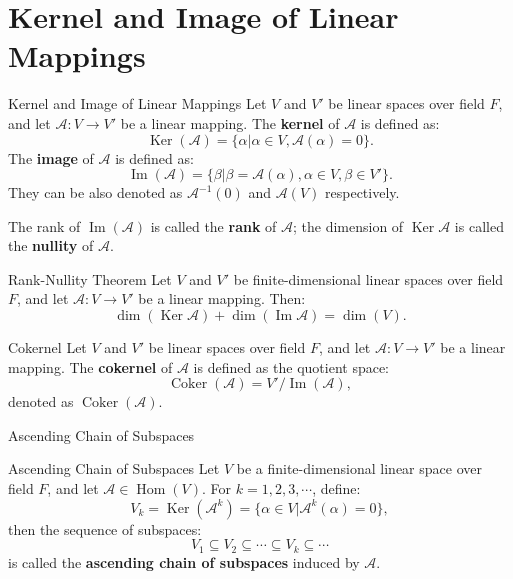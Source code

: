\documentclass[11pt]{../../TexTemplate/elegantbook} %
\begin{document}
\section{Kernel and Image of Linear Mappings}
\begin{definition}{Kernel and Image of Linear Mappings}
    Let \( V \) and \( V' \) be linear spaces over field \( F \), 
    and let \( \mathcal{A}: V \to V' \) be a linear mapping. 
    The \textbf{kernel} of \( \mathcal{A} \) is defined as:
    \[
    \operatorname{Ker}(\mathcal{A}) = \{ \alpha | \alpha \in V, \mathcal{A}(\alpha) = 0 \}.
    \]
    The \textbf{image} of \( \mathcal{A} \) is defined as:
    \[
    \operatorname{Im}(\mathcal{A}) = \{ \beta | \beta = \mathcal{A}(\alpha), 
    \alpha \in V, \beta \in V' \}.
    \]
    They can be also denoted as \( \mathcal{A}^{-1}(0) \) and \( \mathcal{A}(V) \) respectively.

    The rank of \( \operatorname{Im}(\mathcal{A}) \) is called the \textbf{rank} of \( \mathcal{A} \);
    the dimension of \( \operatorname{Ker}\mathcal{A} \) is called the \textbf{nullity} of \( \mathcal{A} \).
\end{definition}

\begin{property}
    
\end{property}


\begin{theorem}{Rank-Nullity Theorem}
    Let \( V \) and \( V' \) be finite-dimensional linear spaces over field \( F \), 
    and let \( \mathcal{A}: V \to V' \) be a linear mapping. Then:
    \[
    \dim(\operatorname{Ker}\mathcal{A}) + \dim(\operatorname{Im}\mathcal{A}) = \dim(V).
    \]
\end{theorem}


\begin{definition}{Cokernel}
    Let \( V \) and \( V' \) be linear spaces over field \( F \), 
    and let \( \mathcal{A}: V \to V' \) be a linear mapping. 
    The \textbf{cokernel} of \( \mathcal{A} \) is defined as the quotient space:
    \[
    \operatorname{Coker}(\mathcal{A}) = V' / \operatorname{Im}(\mathcal{A}),
    \]
    denoted as \( \operatorname{Coker}(\mathcal{A}) \).
\end{definition}

\begin{leftbarTitle}{Ascending Chain of Subspaces}\end{leftbarTitle}
\begin{definition}{Ascending Chain of Subspaces}
    Let \( V \) be a finite-dimensional linear space over field \( F \), 
    and let \( \mathcal{A} \in \operatorname{Hom}(V) \).
    For \( k = 1, 2, 3, \cdots\), define:
    \[
    V_{k} = \operatorname{Ker}(\mathcal{A}^{k}) = \{ \alpha \in V | \mathcal{A}^{k}(\alpha) = 0 \},
    \] 
    then the sequence of subspaces:
    \[
    V_{1} \subseteq V_{2} \subseteq \cdots \subseteq V_{k} \subseteq \cdots
    \]
    is called the \textbf{ascending chain of subspaces} induced by \( \mathcal{A} \).
\end{definition}
\end{document}
